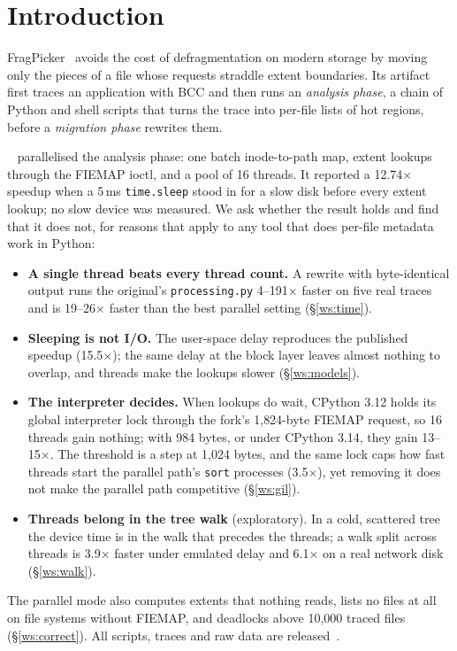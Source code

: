 \section{Introduction}

FragPicker~\cite{park2021fragpicker} avoids the cost of defragmentation on modern
storage by moving only the pieces of a file whose requests straddle extent boundaries.
Its artifact first traces an application with BCC and then runs an \emph{analysis
phase}, a chain of Python and shell scripts that turns the trace into per-file lists of
hot regions, before a \emph{migration phase} rewrites them.

\forkowner~\cite{forkbranch} parallelised the analysis phase: one batch inode-to-path
map, extent lookups through the FIEMAP ioctl, and a pool of 16 threads. It reported a
12.74$\times$ speedup when a 5\,ms \texttt{time.sleep} stood in for a slow disk before
every extent lookup; no slow device was measured. We ask whether the result holds and
find that it does not, for reasons that apply to any tool that does per-file metadata
work in Python:
\begin{itemize}
\item \textbf{A single thread beats every thread count.} A rewrite with byte-identical
  output runs the original's \texttt{processing.py} 4--191$\times$ faster on five real
  traces and is 19--26$\times$ faster than the best parallel setting (\S\ref{ws:time}).
\item \textbf{Sleeping is not I/O.} The user-space delay reproduces the published
  speedup (15.5$\times$); the same delay at the block layer leaves almost nothing to
  overlap, and threads make the lookups slower (\S\ref{ws:models}).
\item \textbf{The interpreter decides.} When lookups do wait, CPython 3.12 holds its
  global interpreter lock through the fork's 1{,}824-byte FIEMAP request, so 16 threads
  gain nothing; with 984 bytes, or under CPython 3.14, they gain 13--15$\times$. The
  threshold is a step at 1{,}024 bytes, and the same lock caps how fast threads start
  the parallel path's \texttt{sort} processes (3.5$\times$), yet removing it does not
  make the parallel path competitive (\S\ref{ws:gil}).
\item \textbf{Threads belong in the tree walk} (exploratory). In a cold, scattered tree
  the device time is in the walk that precedes the threads; a walk split across threads
  is 3.9$\times$ faster under emulated delay and 6.1$\times$ on a real network disk
  (\S\ref{ws:walk}).
\end{itemize}
The parallel mode also computes extents that nothing reads, lists no files at all on
file systems without FIEMAP, and deadlocks above 10{,}000 traced files (\S\ref{ws:correct}).
All scripts, traces and raw data are released~\cite{studybranch}.

